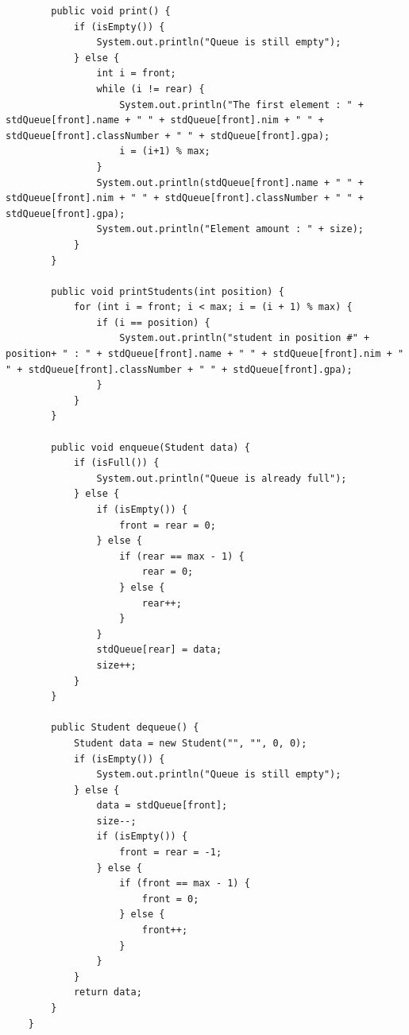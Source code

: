 \documentclass[12pt,titlepage]{article}
\begin{document}
\begin{verbatim}
        public void print() {
            if (isEmpty()) {
                System.out.println("Queue is still empty");
            } else {
                int i = front;
                while (i != rear) {
                    System.out.println("The first element : " + stdQueue[front].name + " " + stdQueue[front].nim + " " + stdQueue[front].classNumber + " " + stdQueue[front].gpa);
                    i = (i+1) % max;
                }
                System.out.println(stdQueue[front].name + " " + stdQueue[front].nim + " " + stdQueue[front].classNumber + " " + stdQueue[front].gpa);
                System.out.println("Element amount : " + size);
            }
        }

        public void printStudents(int position) {
            for (int i = front; i < max; i = (i + 1) % max) {
                if (i == position) {
                    System.out.println("student in position #" + position+ " : " + stdQueue[front].name + " " + stdQueue[front].nim + " " + stdQueue[front].classNumber + " " + stdQueue[front].gpa);
                }
            }
        }

        public void enqueue(Student data) {
            if (isFull()) {
                System.out.println("Queue is already full");
            } else {
                if (isEmpty()) {
                    front = rear = 0;
                } else {
                    if (rear == max - 1) {
                        rear = 0;
                    } else {
                        rear++;
                    }
                }
                stdQueue[rear] = data;
                size++;
            }
        }

        public Student dequeue() {
            Student data = new Student("", "", 0, 0);
            if (isEmpty()) {
                System.out.println("Queue is still empty");
            } else {
                data = stdQueue[front];
                size--;
                if (isEmpty()) {
                    front = rear = -1;
                } else {
                    if (front == max - 1) {
                        front = 0;
                    } else {
                        front++;
                    }
                }
            }
            return data;
        }
    }
\end{verbatim}
\end{document}
